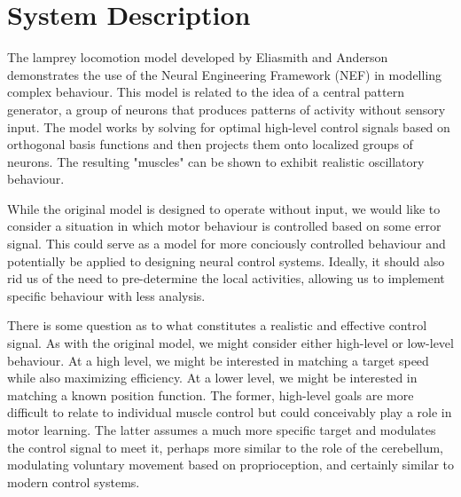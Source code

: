 \documentclass[12pt]{article}
\begin{document}


\onehalfspacing
\tableofcontents
\newpage
\doublespacing
{}
\listoffigures
\newpage


\section{System Description}
The lamprey locomotion model developed by Eliasmith and Anderson \cite{Elias} demonstrates the use of the Neural Engineering Framework (NEF) in modelling complex behaviour. This model is related to the idea of a central pattern generator, a group of neurons that produces patterns of activity without sensory input. The model works by solving for optimal high-level control signals based on orthogonal basis functions and then projects them onto localized groups of neurons. The resulting "muscles" can be shown to exhibit realistic oscillatory behaviour.   

While the original model is designed to operate without input, we would like to consider a situation in which motor behaviour is controlled based on some error signal. This could serve as a model for more conciously controlled behaviour and potentially be applied to designing neural control systems. Ideally, it should also rid us of the need to pre-determine the local activities, allowing us to implement specific behaviour with less analysis.

There is some question as to what constitutes a realistic and effective control signal. As with the original model, we might consider either high-level or low-level behaviour. At a high level, we might be interested in matching a target speed while also maximizing efficiency. At a lower level, we might be interested in matching a known position function. The former, high-level goals are more difficult to relate to individual muscle control but could conceivably play a role in motor learning. The latter assumes a much more specific target and modulates the control signal to meet it, perhaps more similar to the role of the cerebellum, modulating voluntary movement based on proprioception, and certainly similar to modern control systems. 
\end{document}
